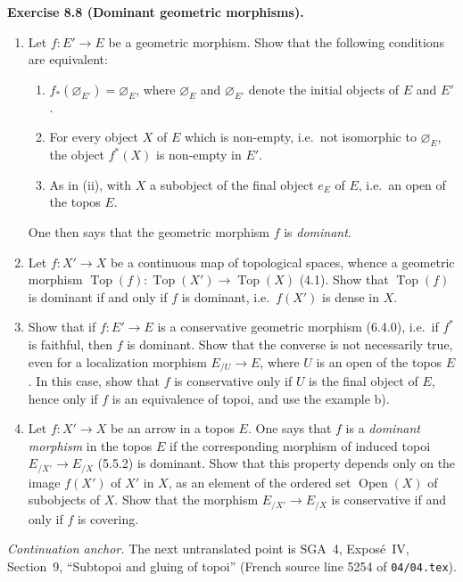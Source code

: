 \documentclass[11pt]{article}
\newcommand{\Top}{\operatorname{Top}}
\newcommand{\ouv}{\operatorname{Open}}
\newcommand{\ie}{i.e.}
\newenvironment{remarktext}[1]{\par\medskip\noindent\textbf{#1.}\ }{\par\medskip}
\begin{document}
\begin{remarktext}{Exercise 8.8 (Dominant geometric morphisms)}
\begin{enumerate}[label=\alph*)]
\item Let \(f:E'\to E\) be a geometric morphism. Show that the following conditions are equivalent:
\begin{enumerate}[label=(\roman*)]
\item \(f_*(\varnothing_{E'})=\varnothing_E\), where \(\varnothing_E\) and \(\varnothing_{E'}\) denote the initial objects of \(E\) and \(E'\).
\item For every object \(X\) of \(E\) which is non-empty, \ie\ not isomorphic to \(\varnothing_E\), the object \(f^*(X)\) is non-empty in \(E'\).
\item As in (ii), with \(X\) a subobject of the final object \(e_E\) of \(E\), \ie\ an open of the topos \(E\).
\end{enumerate}
One then says that the geometric morphism \(f\) is \emph{dominant}.

\item Let \(f:X'\to X\) be a continuous map of topological spaces, whence a geometric morphism \(\Top(f):\Top(X')\to\Top(X)\) (4.1). Show that \(\Top(f)\) is dominant if and only if \(f\) is dominant, \ie\ \(f(X')\) is dense in \(X\).

\item Show that if \(f:E'\to E\) is a conservative geometric morphism (6.4.0), \ie\ if \(f^*\) is faithful, then \(f\) is dominant. Show that the converse is not necessarily true, even for a localization morphism \(E_{/U}\to E\), where \(U\) is an open of the topos \(E\). In this case, show that \(f\) is conservative only if \(U\) is the final object of \(E\), hence only if \(f\) is an equivalence of topoi, and use the example b).

\item Let \(f:X'\to X\) be an arrow in a topos \(E\). One says that \(f\) is a \emph{dominant morphism} in the topos \(E\) if the corresponding morphism of induced topoi \(E_{/X'}\to E_{/X}\) (5.5.2) is dominant. Show that this property depends only on the image \(f(X')\) of \(X'\) in \(X\), as an element of the ordered set \(\ouv(X)\) of subobjects of \(X\). Show that the morphism \(E_{/X'}\to E_{/X}\) is conservative if and only if \(f\) is covering.
\end{enumerate}
\end{remarktext}

\bigskip
\noindent\emph{Continuation anchor.} The next untranslated point is SGA~4, Expos\'e~IV, Section~9, ``Subtopoi and gluing of topoi'' (French source line 5254 of \texttt{04/04.tex}).
\end{document}
